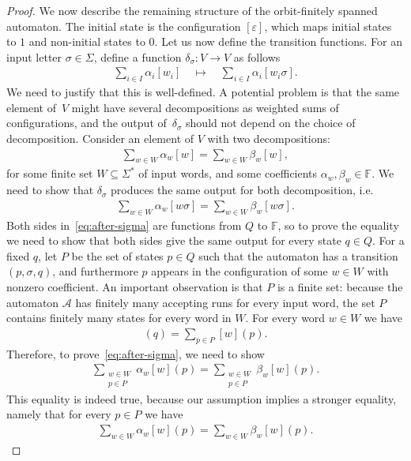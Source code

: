 \documentclass[10pt,a4paper]{amsart}
\numberwithin{equation}{section}
\newcommand{\Aa}{{\mathcal A}}
\newcommand{\field}{\mathbb F}
\begin{document}
\begin{proof}
    We now describe the remaining structure of the orbit-finitely spanned automaton.
     The initial state is the configuration $[\varepsilon]$, which maps initial states to $1$ and non-initial states to $0$. Let us now define the transition functions. 
    For an input letter $\sigma \in \Sigma$, define a function $\delta_\sigma : V \to V$ as follows
    \begin{align*}
     \sum_{i \in I} \alpha_i [w_i]\quad \mapsto \quad  \sum_{i \in I} \alpha_i [w_i \sigma].
    \end{align*}
    We need to justify that this is well-defined. A potential problem  is that the same element of~$V$ might have several decompositions as weighted sums of configurations, and  the  output of~$\delta_\sigma$ should not depend on the choice of decomposition.  
     Consider an element of $V$ with two decompositions: 
        \begin{align*}
            \sum_{w \in W} \alpha_w [w] = 
            \sum_{w \in W} \beta_w [w],
        \end{align*}
        for some finite set $W \subseteq \Sigma^*$ of input words, and some coefficients $\alpha_w,\beta_w\in\field$. 
        We need to show that $\delta_\sigma$ produces the same output for both decomposition, i.e.
        \begin{align}\label{eq:after-sigma}
            \sum_{w \in W} \alpha_w [w \sigma] = 
            \sum_{w \in W} \beta_w [w \sigma].
        \end{align}
        Both sides in~\eqref{eq:after-sigma} are functions from $Q$ to $\field$, so to prove the equality we need to show that both sides give the same output for every state $q\in Q$. For a fixed $q$, let $P$ be the set of states $p \in Q$ such that the automaton has a transition $(p,\sigma,q)$, and furthermore $p$ appears in the configuration of some $w \in W$ with nonzero coefficient.  An important observation is that $P$ is a finite set: because the automaton $\Aa$ has finitely many accepting runs for every input word, the set $P$ contains finitely many states for every word in $W$. For every word $w \in W$ we have 
\begin{align*}
[w\sigma](q) = \sum_{p \in P} [w](p).
\end{align*}
Therefore, to prove~\eqref{eq:after-sigma}, we need to show 
\begin{align*}
    \sum_{\substack{w \in W\\ p \in P}}  \alpha_w [w](p) = 
    \sum_{\substack{w \in W\\ p \in P}}  \beta_w [w](p).
\end{align*}
This equality is indeed true, because our assumption implies a stronger equality, namely that for every $p \in P$ we have 
\begin{align*}
    \sum_{ w \in W}  \alpha_w [w](p) = 
    \sum_{w \in W}  \beta_w [w](p).
\end{align*}



\end{proof}
\end{document}
